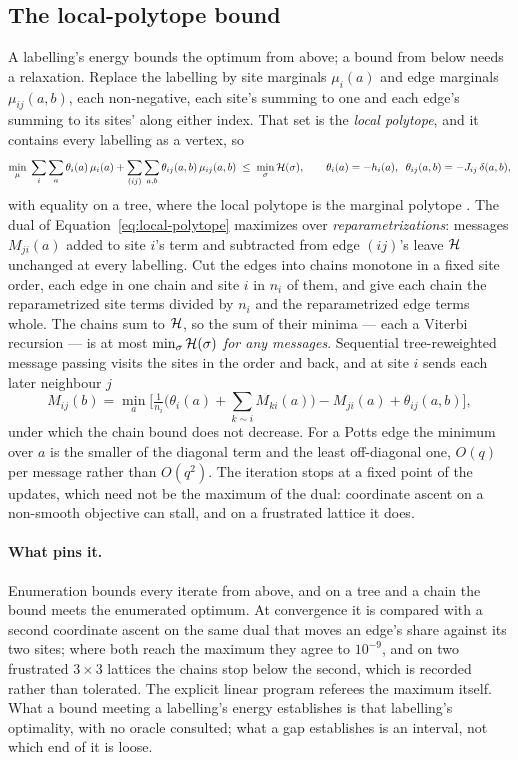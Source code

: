\documentclass[11pt,a4paper]{article}
\begin{document}
\subsection{The local-polytope bound}
\label{sec:potts-lp-bound}
A labelling's energy bounds the optimum from above; a bound from below needs a
relaxation. Replace the labelling by site marginals $\mu_i(a)$ and edge
marginals $\mu_{ij}(a, b)$, each non-negative, each site's summing to one and
each edge's summing to its sites' along either index. That set is the
\emph{local polytope}, and it contains every labelling as a vertex, so
\begin{equation}
  \min_{\mu} \; \sum_i \sum_a \theta_i(a)\,\mu_i(a)
    + \sum_{(ij)} \sum_{a,b} \theta_{ij}(a,b)\,\mu_{ij}(a,b)
  \;\le\; \min_{\sigma} \mathcal{H}(\sigma),
  \qquad
  \theta_i(a) = -h_i(a),\;\; \theta_{ij}(a,b) = -J_{ij}\,\delta(a,b),
  \label{eq:local-polytope}
\end{equation}
with equality on a tree, where the local polytope is the marginal polytope
\citep{wainwright2005map}. The dual of Equation~\ref{eq:local-polytope}
maximizes over \emph{reparametrizations}: messages $M_{ji}(a)$ added to site
$i$'s term and subtracted from edge $(ij)$'s leave $\mathcal{H}$ unchanged at
every labelling. Cut the edges into chains monotone in a fixed site order,
each edge in one chain and site $i$ in $n_i$ of them, and give each chain the
reparametrized site terms divided by $n_i$ and the reparametrized edge terms
whole. The chains sum to $\mathcal{H}$, so the sum of their minima --- each a
Viterbi recursion --- is at most $\min_\sigma \mathcal{H}(\sigma)$ \emph{for any
messages}. Sequential tree-reweighted message passing \citep{kolmogorov2006}
visits the sites in the order and back, and at site $i$ sends each later
neighbour $j$
\begin{equation}
  M_{ij}(b) = \min_a \Big[ \tfrac{1}{n_i}\big(\theta_i(a)
    + \textstyle\sum_{k \sim i} M_{ki}(a)\big) - M_{ji}(a) + \theta_{ij}(a,b) \Big],
  \label{eq:trws-message}
\end{equation}
under which the chain bound does not decrease. For a Potts edge the minimum
over $a$ is the smaller of the diagonal term and the least off-diagonal one,
$O(q)$ per message rather than $O(q^2)$. The iteration stops at a fixed point
of the updates, which need not be the maximum of the dual: coordinate ascent
on a non-smooth objective can stall, and on a frustrated lattice it does.

\paragraph{What pins it.}
Enumeration bounds every iterate from above, and on a tree and a chain the
bound meets the enumerated optimum. At convergence it is compared with a
second coordinate ascent on the same dual that moves an edge's share against
its two sites; where both reach the maximum they agree to $10^{-9}$, and on
two frustrated $3 \times 3$ lattices the chains stop below the second, which
is recorded rather than tolerated. The explicit linear program referees the
maximum itself. What a bound meeting a labelling's energy establishes is that
labelling's optimality, with no oracle consulted; what a gap establishes is an
interval, not which end of it is loose.
\end{document}
